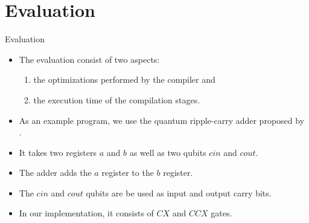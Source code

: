 \section{Evaluation}
\begin{frame}{Evaluation}
    \begin{itemize}
        \item The evaluation consist of two aspects:
        \begin{enumerate}
            \item the optimizations performed by the compiler and
            \item the execution time of the compilation stages.
        \end{enumerate}
        \item As an example program, we use the quantum ripple-carry adder proposed by \cite{CDKM04}.
        \item It takes two registers $a$ and $b$ as well as two qubits $cin$ and $cout$.
        \item The adder adds the $a$ register to the $b$ register.
        \item The $cin$ and $cout$ qubits are be used as input and output carry bits.
        \item In our implementation, it consists of $CX$ and $CCX$ gates.
    \end{itemize}
\end{frame}

